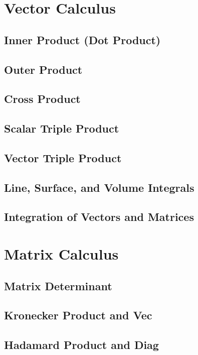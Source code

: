 \chapter{Vector Calculus}
\section{Inner Product (Dot Product)}

\section{Outer Product}
\section{Cross Product}

\section{Scalar Triple Product}
\section{Vector Triple Product}
\section{Line, Surface, and Volume Integrals}
\section{Integration of Vectors and Matrices}


\chapter{Matrix Calculus}
\section{Matrix Determinant}
\section{Kronecker Product and Vec}
\section{Hadamard Product and Diag}

